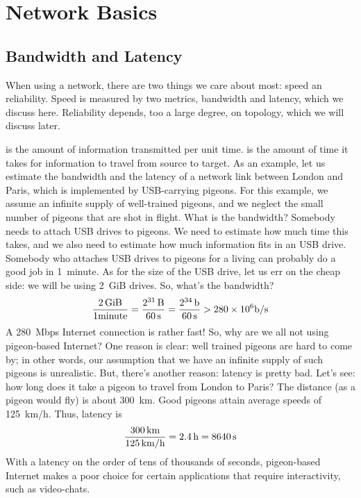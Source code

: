 \chapter{Network Basics}\label{ch:06-net-use}

\section{Bandwidth and Latency}

When using a network, there are two things we care about most: speed an reliability.
Speed is measured by two metrics, bandwidth and latency, which we discuss here.
Reliability depends, too a large degree, on topology, which we will discuss later.

 is the amount of information transmitted per unit time.
 is the amount of time it takes for information to travel
  from source to target.
As an example,
  let us estimate the bandwidth and the latency
  of a network link between London and Paris,
  which is implemented by USB-carrying pigeons.
For this example,
  we assume an infinite supply of well-trained pigeons,
  and we neglect the small number of pigeons that are shot in flight.
What is the bandwidth?
Somebody needs to attach USB drives to pigeons.
We need to estimate how much time this takes,
  and we also need to estimate how much information fits in an USB drive.
Somebody who attaches USB drives to pigeons for a living
  can probably do a good job in 1~minute.
As for the size of the USB drive,
  let us err on the cheap side: we will be using 2~GiB drives.
So, what's the bandwidth?
\[
\frac{2\,{\rm GiB}}{1\.{\rm minute}}
  = \frac{2^{31}\,{\rm B}}{60\,{\rm s}}
  = \frac{2^{34}\,{\rm b}}{60\,{\rm s}}
  > 280\times 10^6 {\rm b}/{\rm s}
\]
A 280~Mbps Internet connection is rather fast!
So, why are we all not using pigeon-based Internet?
One reason is clear: well trained pigeons are hard to come by;
  in other words,
  our assumption that we have an infinite supply of such pigeons is unrealistic.
But, there's another reason: latency is pretty bad.
Let's see: how long does it take a pigeon to travel from London to Paris?
The distance (as a pigeon would fly) is about 300~km.
Good pigeons attain average speeds of 125~km/h.
Thus, latency is
\[
\frac{300\,{\rm km}}{125\,{\rm km}/{\rm h}}
  = 2.4\,{\rm h} = 8640\,{\rm s}
\]
With a latency on the order of tens of thousands of seconds,
  pigeon-based Internet makes a poor choice for certain applications
  that require interactivity, such as video-chats.

